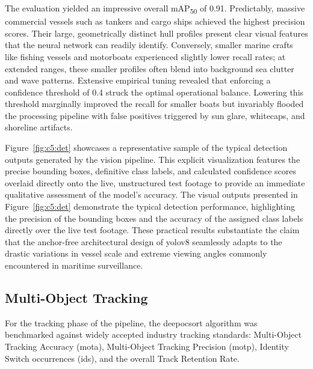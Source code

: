 The evaluation yielded an impressive overall mAP\textsubscript{50} of 0.91. Predictably, massive commercial vessels such as tankers and cargo ships achieved the highest precision scores. Their large, geometrically distinct hull profiles present clear visual features that the neural network can readily identify. Conversely, smaller marine crafts like fishing vessels and motorboats experienced slightly lower recall rates; at extended ranges, these smaller profiles often blend into background sea clutter and wave patterns. Extensive empirical tuning revealed that enforcing a confidence threshold of 0.4 struck the optimal operational balance. Lowering this threshold marginally improved the recall for smaller boats but invariably flooded the processing pipeline with false positives triggered by sun glare, whitecaps, and shoreline artifacts.
\begin{reportfigblock}
Figure~\ref{fig:c5:det} showcases a representative sample of the typical detection outputs generated by the vision pipeline. This explicit visualization features the precise bounding boxes, definitive class labels, and calculated confidence scores overlaid directly onto the live, unstructured test footage to provide an immediate qualitative assessment of the model's accuracy.
The visual outputs presented in Figure~\ref{fig:c5:det} demonstrate the typical detection performance, highlighting the precision of the bounding boxes and the accuracy of the assigned class labels directly over the live test footage. These practical results substantiate the claim that the anchor-free architectural design of \gls{yolov8} seamlessly adapts to the drastic variations in vessel scale and extreme viewing angles commonly encountered in maritime surveillance.
\end{reportfigblock}

\subsection{Multi-Object Tracking}

For the tracking phase of the pipeline, the \gls{deepocsort} algorithm was benchmarked against widely accepted industry tracking standards: Multi-Object Tracking Accuracy (\gls{mota}), Multi-Object Tracking Precision (\gls{motp}), Identity Switch occurrences (\gls{ids}), and the overall Track Retention Rate.

